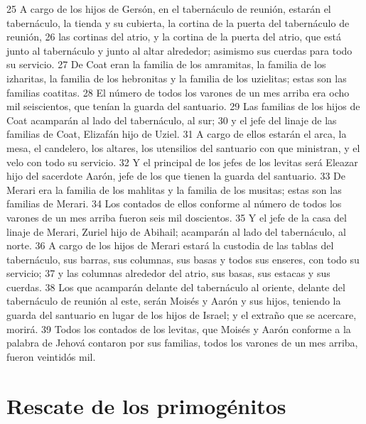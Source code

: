 25 A cargo de los hijos de Gersón, en el tabernáculo de reunión, estarán el tabernáculo, la tienda y su cubierta, la cortina de la puerta del tabernáculo de reunión,
26 las cortinas del atrio, y la cortina de la puerta del atrio, que está junto al tabernáculo y junto al altar alrededor; asimismo sus cuerdas para todo su servicio.
27 De Coat eran la familia de los amramitas, la familia de los izharitas, la familia de los hebronitas y la familia de los uzielitas; estas son las familias coatitas.
28 El número de todos los varones de un mes arriba era ocho mil seiscientos, que tenían la guarda del santuario.
29 Las familias de los hijos de Coat acamparán al lado del tabernáculo, al sur;
30 y el jefe del linaje de las familias de Coat, Elizafán hijo de Uziel.
31 A cargo de ellos estarán el arca, la mesa, el candelero, los altares, los utensilios del santuario con que ministran, y el velo con todo su servicio.
32 Y el principal de los jefes de los levitas será Eleazar hijo del sacerdote Aarón, jefe de los que tienen la guarda del santuario.
33 De Merari era la familia de los mahlitas y la familia de los musitas; estas son las familias de Merari.
34 Los contados de ellos conforme al número de todos los varones de un mes arriba fueron seis mil doscientos.
35 Y el jefe de la casa del linaje de Merari, Zuriel hijo de Abihail; acamparán al lado del tabernáculo, al norte.
36 A cargo de los hijos de Merari estará la custodia de las tablas del tabernáculo, sus barras, sus columnas, sus basas y todos sus enseres, con todo su servicio;
37 y las columnas alrededor del atrio, sus basas, sus estacas y sus cuerdas.
38 Los que acamparán delante del tabernáculo al oriente, delante del tabernáculo de reunión al este, serán Moisés y Aarón y sus hijos, teniendo la guarda del santuario en lugar de los hijos de Israel; y el extraño que se acercare, morirá.
39 Todos los contados de los levitas, que Moisés y Aarón conforme a la palabra de Jehová contaron por sus familias, todos los varones de un mes arriba, fueron veintidós mil.

\section*{Rescate de los primogénitos}

